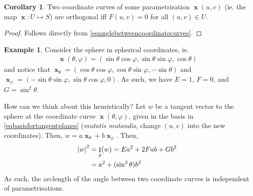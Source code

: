\documentclass{amsart} %
\theoremstyle{mytheoremstyle}
\theoremstyle{definition}
\newtheorem{corollary}[definition]{Corollary}
\newtheorem{example}[definition]{Example}
\numberwithin{equation}{section}
\DeclareMathOperator{\I}{I}
\DeclareMathOperator{\1}{\mathbbm{1}}
\DeclareMathOperator{\x}{\mathbf{x}}
\renewcommand{\phi}{\varphi}
\renewcommand{\phi}{\varphi}
\begin{document}
\begin{corollary}
	\label{cororthogonalcoordinatecurves}
	Two coordinate curves of some parametrisation $\x(u,v)$ (ie. the map $\x: U \mapsto S$) are orthogonal iff $F(u,v) = 0$ for all $(u,v) \in U$.
\end{corollary}

\begin{proof}
	Follows directly from \eqref{eqanglebetweencoordinatecurves}.
\end{proof}

\begin{example}
	\label{examplesphereinsphericalcoordinates}
	Consider the sphere in spherical coordinates, ie. 
	\begin{align*}
		\x(\theta,\phi) = (\sin \theta \cos \phi, \sin \theta \sin \phi, \cos \theta)
	\end{align*}
	and notice that $\x_{\theta} = (\cos \theta \cos \phi, \cos \theta \sin \phi, -\sin \theta)$ and $\x_{\phi} = (-\sin \theta \sin \phi, \sin \theta \cos \phi, 0)$. As such, we have $E=1$, $F=0$, and $G = \sin^2 \theta$. 
	
	How can we think about this heuristically? Let $w$ be a tangent vector to the sphere at the coordinate curve $\x(\theta,\phi)$, given in the basis in \eqref{eqbasisfortangentplanes} (\textit{mutatis mutandis}, change $(u,v)$ into the new coordinates). Then, $w = a \x_{\theta} + b \x_{\phi}$. Then,
	\begin{align*}
		\abs{w}^2 &= \I_p (w) = Ea^2 + 2F ab + G b^2 \\
		&= a^2 + (\sin^2 \theta) b^2 
	\end{align*}
	As such, the arclength of the angle between two coordinate curves is independent of parametrisations.
\end{example}
\end{document}
